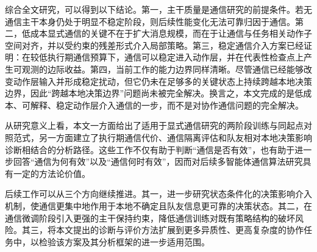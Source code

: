 综合全文研究，可以得到以下结论。第一，主干质量是通信研究的前提条件。若无通信主干本身仍处于明显不稳定阶段，则后续性能变化无法可靠归因于通信。第二，低成本显式通信的关键不在于扩大消息规模，而在于让通信与任务相关动作子空间对齐，并以受约束的残差形式介入局部策略。第三，稳定通信介入方案已经证明：在较低执行期通信预算下，通信可以稳定进入动作层，并在代表性检查点上产生可观测的边际收益。第四，当前工作的能力边界同样清晰。尽管通信已经能够改变动作层输入并形成稳定扰动，但它仍未在足够多的关键状态上持续跨越本地决策边界，因此“跨越本地决策边界”问题尚未被完全解决。换言之，本文完成的是低成本、可解释、稳定动作层介入通信的一步，而不是对协作通信问题的完全解决。

从研究意义上看，本文一方面给出了适用于显式通信研究的两阶段训练与同起点对照范式，另一方面建立了执行期通信代价、通信隔离评估和队友相对本地决策影响诊断相结合的分析路径。这些工作不仅有助于判断“通信是否有效”，也有助于进一步回答“通信为何有效”以及“通信何时有效”，因而对后续多智能体通信算法研究具有一定的方法论价值。

后续工作可以从三个方向继续推进。其一，进一步研究状态条件化的决策影响介入机制，使通信更集中地作用于本地不确定且队友信息更可靠的决策状态。其二，在通信微调阶段引入更强的主干保持约束，降低通信训练对既有策略结构的破坏风险。其三，将本文提出的诊断与评价方法扩展到更多异质性、更高复杂度的协作任务中，以检验该方案及其分析框架的进一步适用范围。
